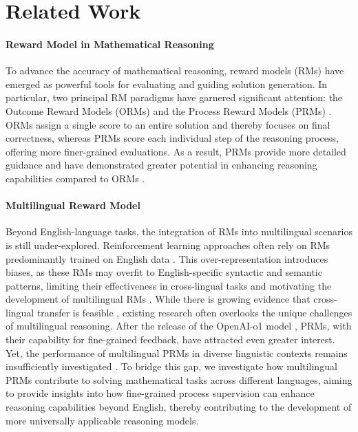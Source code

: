 \section{Related Work}
\label{sec:related_work}

\paragraph{Reward Model in Mathematical Reasoning}

To advance the accuracy of mathematical reasoning, reward models (RMs) have emerged as powerful tools for evaluating and guiding solution generation. In particular, two principal RM paradigms have garnered significant attention: the Outcome Reward Models (ORMs) \citep{orm1,orm2} and the Process Reward Models (PRMs) \citep{solving,prm800k,making,let,shepherd,improve,bugs,openr}. ORMs assign a single score to an entire solution and thereby focuses on final correctness, whereas PRMs score each individual step of the reasoning process, offering more finer-grained evaluations. As a result, PRMs provide more detailed guidance and have demonstrated greater potential in enhancing reasoning capabilities compared to ORMs \citep{prm800k,fine}.



\paragraph{Multilingual Reward Model}

Beyond English-language tasks, the integration of RMs into multilingual scenarios is still under-explored. 
Reinforcement learning approaches often rely on RMs predominantly trained on English data \citep{deepseek,qwen}. This over-representation introduces biases, as these RMs may overfit to English-specific syntactic and semantic patterns, limiting their effectiveness in cross-lingual tasks and motivating the development of multilingual RMs \citep{crossrm}. While there is growing evidence that cross-lingual transfer is feasible \citep{reuse,crossrm}, existing research often overlooks the unique challenges of multilingual reasoning.
After the release of the OpenAI-o1 model \citep{o1}, PRMs, with their capability for fine-grained feedback, have attracted even greater interest. Yet, the performance of multilingual PRMs in diverse linguistic contexts remains insufficiently investigated \citep{imbalance}. To bridge this gap, we investigate how multilingual PRMs contribute to solving mathematical tasks across different languages, aiming to provide insights into how fine-grained process supervision can enhance reasoning capabilities beyond English, thereby contributing to the development of more universally applicable reasoning models.
